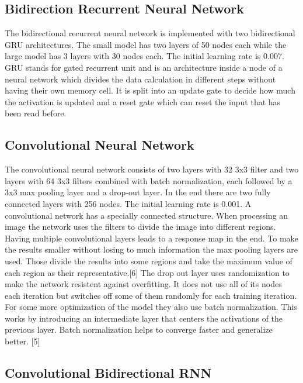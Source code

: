\documentclass[11pt,twocolumn]{article}
\begin{document}
\subsection*{Bidirection Recurrent Neural Network}

The bidirectional recurrent neural network is implemented with two bidirectional GRU architectures. The small model has two layers of 50 nodes each while the large model has 3 layers with 30 nodes each. The initial learning rate is 0.007.\newline
GRU stands for gated recurrent unit and is an architecture inside a node of a neural network which divides the data calculation in different steps without having their own memory cell. It is split into an update gate to decide how much the activation is updated and a reset gate which can reset the input that has been read before.

\subsection*{Convolutional Neural Network}

The convolutional neural network consists of two layers with 32 3x3 filter and two layers with 64 3x3 filters combined with batch normalization, each followed by a 3x3 max pooling layer and a drop-out layer. In the end there are two fully connected layers with 256 nodes. The initial learning rate is 0.001.\newline
A convolutional network has a specially connected structure. When processing an image the network uses the filters to divide the image into different regions. Having multiple convolutional layers leads to a response map in the end.\newline
To make the results smaller without losing to much information the max pooling layers are used. Those divide the results into some regions and take the maximum value of each region as their representative.[6]\newline
The drop out layer uses randomization to make the network resistent against overfitting. It does not use all of its nodes each iteration but switches off some of them randomly for each training iteration.\newline
For some more optimization of the model they also use batch normalization. This works by introducing an intermediate layer that centers the activations of the previous layer. Batch normalization helps to converge faster and generalize better. [5]

\subsection*{Convolutional Bidirectional RNN}
\end{document}
